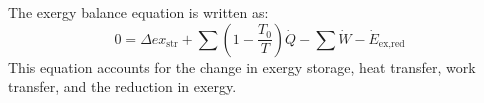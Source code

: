The exergy balance equation is written as:  
\[
0 = \Delta ex_{\text{str}} + \sum \left( 1 - \frac{T_0}{T} \right) \dot{Q} - \sum \dot{W} - \dot{E}_{\text{ex,red}}
\]  
This equation accounts for the change in exergy storage, heat transfer, work transfer, and the reduction in exergy.